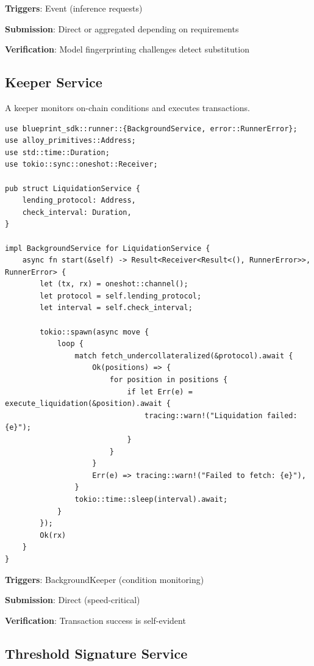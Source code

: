 \documentclass[11pt,a4paper]{article}
\begin{document}
\textbf{Triggers}: Event (inference requests)

\textbf{Submission}: Direct or aggregated depending on requirements

\textbf{Verification}: Model fingerprinting challenges detect substitution

\subsection{Keeper Service}

A keeper monitors on-chain conditions and executes transactions.

\begin{lstlisting}
use blueprint_sdk::runner::{BackgroundService, error::RunnerError};
use alloy_primitives::Address;
use std::time::Duration;
use tokio::sync::oneshot::Receiver;

pub struct LiquidationService {
    lending_protocol: Address,
    check_interval: Duration,
}

impl BackgroundService for LiquidationService {
    async fn start(&self) -> Result<Receiver<Result<(), RunnerError>>, RunnerError> {
        let (tx, rx) = oneshot::channel();
        let protocol = self.lending_protocol;
        let interval = self.check_interval;

        tokio::spawn(async move {
            loop {
                match fetch_undercollateralized(&protocol).await {
                    Ok(positions) => {
                        for position in positions {
                            if let Err(e) = execute_liquidation(&position).await {
                                tracing::warn!("Liquidation failed: {e}");
                            }
                        }
                    }
                    Err(e) => tracing::warn!("Failed to fetch: {e}"),
                }
                tokio::time::sleep(interval).await;
            }
        });
        Ok(rx)
    }
}
\end{lstlisting}

\textbf{Triggers}: BackgroundKeeper (condition monitoring)

\textbf{Submission}: Direct (speed-critical)

\textbf{Verification}: Transaction success is self-evident

\subsection{Threshold Signature Service}
\end{document}
